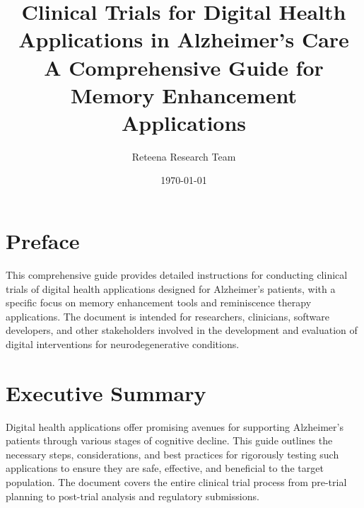 \documentclass[12pt,a4paper]{book}
\title{\Huge \textbf{Clinical Trials for Digital Health Applications in Alzheimer's Care} \\
\vspace{0.5cm}
\Large A Comprehensive Guide for Memory Enhancement Applications}
\author{Reteena Research Team}
\date{\today}
\begin{document}
\frontmatter
\maketitle

\tableofcontents
\listoffigures
\listoftables

\chapter*{Preface}
This comprehensive guide provides detailed instructions for conducting clinical trials of digital health applications designed for Alzheimer's patients, with a specific focus on memory enhancement tools and reminiscence therapy applications. The document is intended for researchers, clinicians, software developers, and other stakeholders involved in the development and evaluation of digital interventions for neurodegenerative conditions.

\chapter*{Executive Summary}
Digital health applications offer promising avenues for supporting Alzheimer's patients through various stages of cognitive decline. This guide outlines the necessary steps, considerations, and best practices for rigorously testing such applications to ensure they are safe, effective, and beneficial to the target population. The document covers the entire clinical trial process from pre-trial planning to post-trial analysis and regulatory submissions.

\mainmatter












\backmatter
\end{document}
